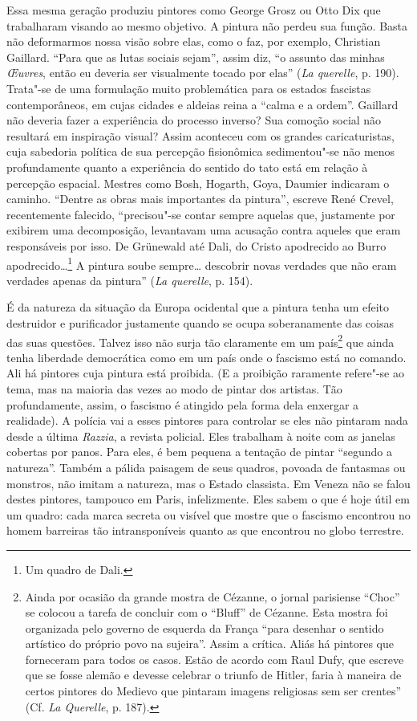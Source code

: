Essa mesma geração produziu pintores como George Grosz ou Otto Dix que
trabalharam visando ao mesmo objetivo. A pintura não perdeu sua função.
Basta não deformarmos nossa visão sobre elas, como o faz, por
exemplo, Christian Gaillard. ``Para que as lutas sociais sejam'', assim
diz, ``o assunto das minhas \emph{\OE uvres}, então eu deveria ser
visualmente tocado por elas'' (\emph{La querelle}, p. 190). Trata"-se de
uma formulação muito problemática para os estados fascistas contemporâneos, em cujas cidades e aldeias reina a
``calma e a ordem''. Gaillard não
deveria fazer a experiência do processo inverso? Sua comoção social não
resultará em inspiração visual? Assim aconteceu com os grandes
caricaturistas, cuja sabedoria política de sua percepção fisionômica
sedimentou"-se não menos profundamente quanto a experiência do sentido do
tato está em relação à percepção espacial. Mestres como Bosh, Hogarth,
Goya, Daumier indicaram o caminho. ``Dentre as obras mais importantes da
pintura'', escreve René Crevel, recentemente falecido, ``precisou"-se
contar sempre aquelas que, justamente por exibirem uma
decomposição, levantavam uma acusação contra aqueles que eram responsáveis por isso. De Grünewald
até Dali, do Cristo apodrecido ao Burro apodrecido\ldots{}\footnote{Um quadro de
  Dali.} A pintura soube sempre\ldots{} descobrir novas verdades que não
eram verdades apenas da pintura'' (\emph{La querelle}, p. 154).

É da natureza da situação da Europa ocidental que a pintura tenha um efeito destruidor e purificador justamente quando se ocupa soberanamente das coisas das suas questões.
Talvez isso não surja tão claramente em um
país\footnote{Ainda por ocasião da grande mostra de Cézanne, o jornal
  parisiense ``Choc'' se colocou a tarefa de concluir com o ``Bluff'' de
  Cézanne. Esta mostra foi organizada pelo governo de esquerda da França
  ``para desenhar o sentido artístico do próprio povo na sujeira''.
  Assim a crítica. Aliás há pintores que forneceram para todos os casos.
  Estão de acordo com Raul Dufy, que escreve que se fosse alemão e
  devesse celebrar o triunfo de Hitler, faria à maneira de certos
  pintores do Medievo que pintaram imagens religiosas sem ser
  crentes'' (Cf. \emph{La Querelle}, p. 187).} que ainda tenha liberdade
democrática como em um país onde o fascismo está no comando. Ali há
pintores cuja pintura está proibida. (E a proibição raramente refere"-se
ao tema, mas na maioria das vezes ao modo de pintar dos artistas. Tão
profundamente, assim, o fascismo é atingido pela forma dela enxergar a realidade). A
polícia vai a esses pintores para controlar se eles não pintaram nada
desde a última \emph{Razzia}, a revista policial. Eles trabalham à noite
com as janelas cobertas por panos. Para eles, é bem pequena a tentação
de pintar ``segundo a natureza''. Também a pálida paisagem de seus
quadros, povoada de fantasmas ou monstros, não imitam a
natureza, mas o Estado classista. Em Veneza não se falou destes
pintores, tampouco em Paris, infelizmente. Eles sabem o que é hoje útil
em um quadro: cada marca secreta ou visível que mostre que o fascismo
encontrou no homem barreiras tão intransponíveis quanto as que encontrou no globo
terrestre.
